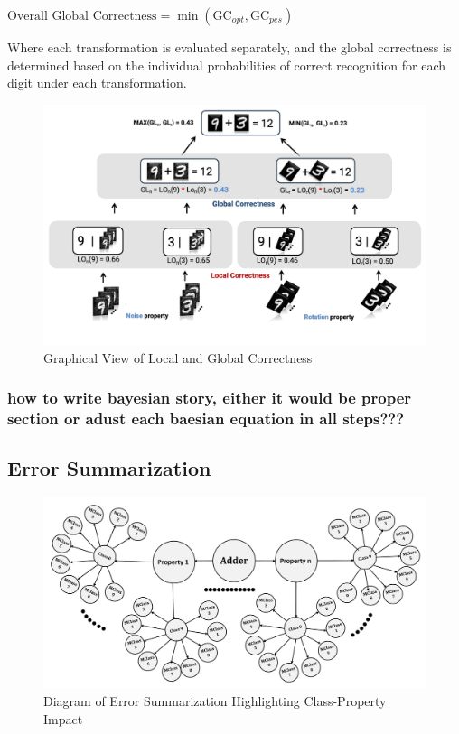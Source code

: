\documentclass[10pt, conference, a4paper, final]{IEEEtran}
\begin{document}
        $ \text{Overall Global Correctness} = \min(\text{GC}_{opt}, \text{GC}_{pes})$

    
    Where each transformation is evaluated separately, and the global correctness is determined based on the individual probabilities of correct recognition for each digit under each transformation.
    \begin{figure}{}
        \centering
        \includegraphics[width=\linewidth]{paper_images/noise_rotation_localcal_global.pdf}
        \caption{Graphical View of Local and Global Correctness}
        \label{fig:graph}
    \end{figure}

 
\subsubsection{how to write bayesian story, either it would be proper section or adust each baesian equation in all steps??? }
\subsection{Error Summarization}

\begin{figure}[H]
    \centering
    \includegraphics[width=\linewidth]{paper_images/step5.pdf}
    \caption{Diagram of Error Summarization Highlighting Class-Property Impact}
    \label{fig:error-summarization}
\end{figure}
\end{document}
